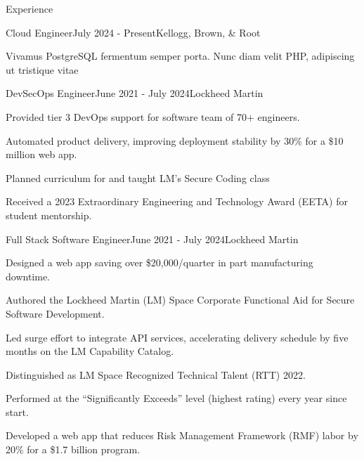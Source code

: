 \documentclass[
	11pt, %
]{resume} %
\begin{document}

\begin{rSection}{Experience}

	\begin{rSubsection}{Cloud Engineer}{July 2024 - Present}{Kellogg, Brown, \& Root}
		\item Vivamus PostgreSQL fermentum semper porta. Nunc diam velit PHP, adipiscing ut tristique vitae
	\end{rSubsection}


	\begin{rSubsection}{DevSecOps Engineer}{June 2021 - July 2024}{Lockheed Martin}
		\item Provided tier 3 DevOps support for software team of 70+ engineers.
		\item Automated product delivery, improving deployment stability by 30\% for a \$10 million web app.
		\item Planned curriculum for and taught LM’s Secure Coding class
		\item Received a 2023 Extraordinary Engineering and Technology Award (EETA) for student mentorship.
	\end{rSubsection}


	\begin{rSubsection}{Full Stack Software Engineer}{June 2021 - July 2024}{Lockheed Martin}
		\item Designed a web app saving over \$20,000/quarter in part manufacturing downtime.
		\item Authored the Lockheed Martin (LM) Space Corporate Functional Aid for Secure Software Development.
		\item Led surge effort to integrate API services, accelerating delivery schedule by five months on the LM Capability Catalog.
		\item Distinguished as LM Space Recognized Technical Talent (RTT) 2022.
		\item Performed at the “Significantly Exceeds” level (highest rating) every year since start.
		\item Developed a web app that reduces Risk Management Framework (RMF) labor by 20\% for a \$1.7 billion program.
	\end{rSubsection}


\end{rSection}
\end{document}
